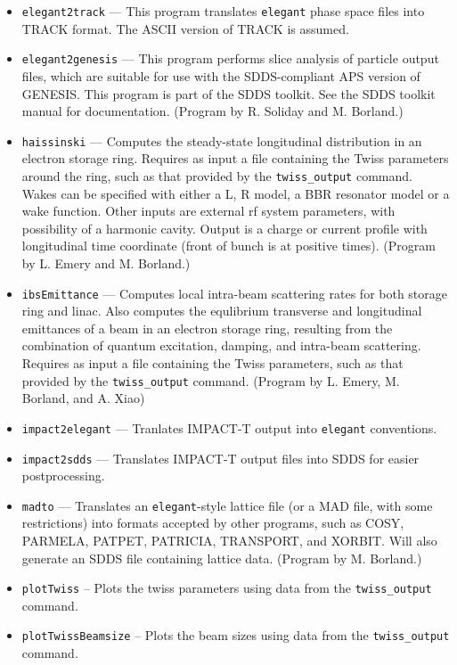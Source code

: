 \documentclass[11pt]{article}
\begin{document}
\begin{itemize}
\item {\tt elegant2track} --- This program translates {\tt elegant} phase space files into TRACK \cite{TRACK} format.
  The ASCII version of TRACK is assumed.
\item {\tt elegant2genesis} --- This program performs
        slice analysis of particle output files, which are suitable for use with
        the SDDS-compliant APS version of GENESIS\cite{GENESIS}.  This program is
        part of the SDDS toolkit.  See the SDDS toolkit
        manual for documentation. (Program by R. Soliday and M. Borland.)
\item {\tt haissinski} --- Computes the steady-state longitudinal distribution in
        an electron storage ring.  Requires as input a file containing the Twiss
        parameters around the ring, such as that provided by the \verb|twiss_output| command.
        Wakes can be specified with either a L, R model, a BBR resonator model or a wake function.
        Other inputs are external rf system parameters, with possibility of a harmonic
        cavity. Output is a charge or current profile with longitudinal time coordinate (front
        of bunch is at positive times). 
        (Program by L. Emery and M. Borland.)
\item {\tt ibsEmittance} --- Computes local intra-beam scattering rates for both storage ring
        and linac. Also computes the equlibrium transverse and longitudinal emittances of a 
        beam in an electron storage ring, resulting from the combination of quantum excitation,
        damping, and intra-beam scattering.  Requires as input a file containing the
        Twiss parameters, such as that provided by the \verb|twiss_output| command.
        (Program by L. Emery, M. Borland, and A. Xiao)
\item {\tt impact2elegant} --- Tranlates IMPACT-T \cite{IMPACT} output into {\tt elegant} conventions.
\item {\tt impact2sdds} --- Translates IMPACT-T output files into SDDS for easier postprocessing.
\item {\tt madto} --- Translates an {\tt elegant}-style lattice file (or a MAD file, with
        some restrictions) into formats accepted by other programs, such as COSY, PARMELA, 
        PATPET, PATRICIA, TRANSPORT, and XORBIT.  Will also generate an SDDS file containing lattice
        data.  (Program by M. Borland.)
\item {\tt plotTwiss} -- Plots the twiss parameters using data from the \verb|twiss_output| command.
\item {\tt plotTwissBeamsize} -- Plots the beam sizes using data from the \verb|twiss_output| command.

\end{itemize}
\end{document}
